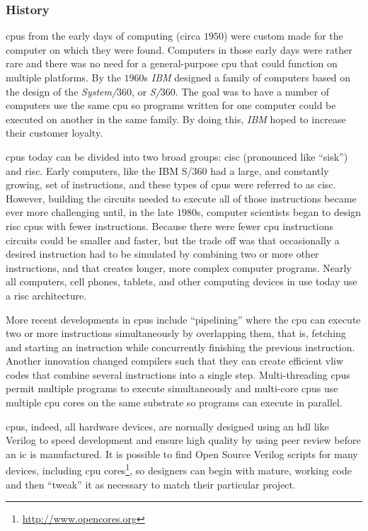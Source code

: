 \subsubsection{History}

\glspl{cpu} from the early days of computing (circa $ 1950 $) were custom made for the computer on which they were found. Computers in those early days were rather rare and there was no need for a general-purpose \gls{cpu} that could function on multiple platforms. By the $ 1960 $s \emph{IBM} designed a family of computers based on the design of the \emph{System/$ 360 $}, or \emph{S/$ 360 $}. The goal was to have a number of computers use the same \gls{cpu} so programs written for one computer could be executed on another in the same family. By doing this, \emph{IBM} hoped to increase their customer loyalty.

\glspl{cpu} today can be divided into two broad groups: \gls{cisc} (pronounced like ``sisk'') and \gls{risc}. Early computers, like the IBM S/$ 360 $ had a large, and constantly growing, set of instructions, and these types of \glspl{cpu} were referred to as \gls{cisc}. However, building the circuits needed to execute all of those instructions became ever more challenging until, in the late $ 1980 $s, computer scientists began to design \gls{risc} \glspl{cpu} with fewer instructions. Because there were fewer \gls{cpu} instructions circuits could be smaller and faster, but the trade off was that occasionally a desired instruction had to be simulated by combining two or more other instructions, and that creates longer, more complex computer programs. Nearly all computers, cell phones, tablets, and other computing devices in use today use a \gls{risc} architecture.

More recent developments in \glspl{cpu} include ``pipelining'' where the \gls{cpu} can execute two or more instructions simultaneously by overlapping them, that is, fetching and starting an instruction while concurrently finishing the previous instruction. Another innovation changed compilers such that they can create efficient \gls{vliw} codes that combine several instructions into a single step. Multi-threading \glspl{cpu} permit multiple programs to execute simultaneously and multi-core \glspl{cpu} use multiple \gls{cpu} cores on the same substrate so programs can execute in parallel. 

\glspl{cpu}, indeed, all hardware devices, are normally designed using an \gls{hdl} like Verilog to speed development and ensure high quality by using peer review before an \gls{ic} is manufactured. It is possible to find Open Source Verilog scripts for many devices, including \gls{cpu} cores\footnote{\url{http://www.opencores.org}}, so designers can begin with mature, working code and then ``tweak'' it as necessary to match their particular project.

